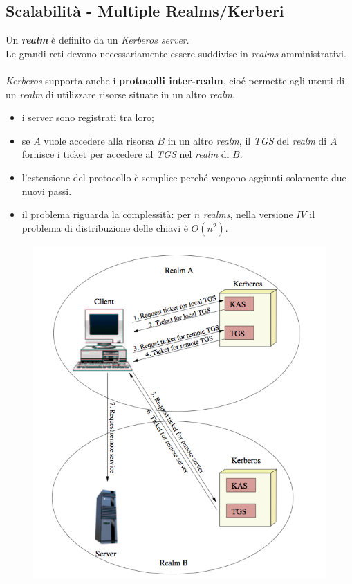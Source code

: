 \documentclass[11pt, a4paper, twoside, italian]{report}
\theoremstyle{plain}
\begin{document}
\subsection*{Scalabilità - Multiple Realms/Kerberi}
\begin{multicols}{2}
	\noindent
	Un \textit{\textbf{realm}} è definito da un \textit{Kerberos server}.\\
	Le grandi reti devono necessariamente essere suddivise in \textit{realms} amministrativi.\\\\
	\textit{Kerberos} supporta anche i \textbf{protocolli inter-realm}, cioé permette agli utenti di un \textit{realm} di utilizzare risorse situate in un altro \textit{realm}.
	\begin{itemize}
		\item i server sono registrati tra loro;
		\item se $A$ vuole accedere alla risorsa $B$ in un altro \textit{realm}, il \textit{TGS} del \textit{realm} di $A$ fornisce i ticket per accedere al \textit{TGS} nel \textit{realm} di $B$.
		\item l'estensione del protocollo è semplice perché vengono aggiunti solamente due nuovi passi.
		\item il problema riguarda la complessità: per $n$ \textit{realms}, nella versione $IV$ il problema di distribuzione delle chiavi è $O(n^{2})$.
	\end{itemize}
\columnbreak
	\begin{figure}[H]
		\centering
		\includegraphics[scale=0.8]{kerberi}
	\end{figure}
\end{multicols}
\end{document}
